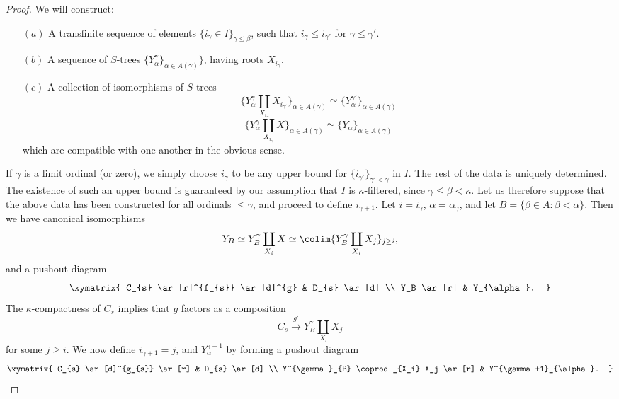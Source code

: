 \begin{proof}
We will construct:
\begin{itemize}
\item[$(a)$] A transfinite sequence of elements $\{ i_{\gamma} \in I \}_{\gamma \leq \beta}$, such that $i_{\gamma} \leq i_{\gamma'}$ for $\gamma \leq \gamma'$. 
\item[$(b)$] A sequence of $S$-trees $\{ Y^{\gamma}_{\alpha} \}_{\alpha \in A(\gamma)} \}$, having roots $X_{i_{\gamma}}$. 
\item[$(c)$] A collection of isomorphisms of $S$-trees
$$ \{ Y^{\gamma}_{\alpha} \coprod_{X_{i_{\gamma}}} X_{i_{\gamma'}} \}_{\alpha \in A(\gamma)}
\simeq \{ Y^{\gamma'}_{\alpha} \}_{\alpha \in A(\gamma)}$$
$$ \{ Y^{\gamma}_{\alpha} \coprod_{ X_{i_{\gamma}}} X \}_{\alpha \in A(\gamma)}
\simeq \{ Y_{\alpha} \}_{ \alpha \in A(\gamma) }$$
which are compatible with one another in the obvious sense.
\end{itemize}
If $\gamma$ is a limit ordinal (or zero), we simply choose $i_{\gamma}$ to be
any upper bound for $\{ i_{\gamma'} \}_{\gamma' < \gamma}$ in $I$. The rest of the data is uniquely determined. The existence of such an upper bound is guaranteed by our assumption that $I$ is $\kappa$-filtered, since $\gamma \leq \beta < \kappa$. Let us therefore suppose that the above data has been constructed for all ordinals $\leq \gamma$, and proceed to define $i_{\gamma+1}$.
Let $i = i_{\gamma}$, $\alpha = \alpha_{\gamma}$, and let $B = \{ \beta \in A: \beta < \alpha \}$. Then
we have canonical isomorphisms
$$Y_{B} \simeq Y^{\gamma}_{B} \coprod_{X_i} X
\simeq \colim \{ Y^{\gamma}_{B} \coprod_{X_i} X_j \}_{j \geq i},$$
and a pushout diagram
$$ \xymatrix{ C_{s} \ar[r]^{f_{s}} \ar[d]^{g} & D_{s} \ar[d] \\
Y_B \ar[r] & Y_{\alpha}. }$$
The $\kappa$-compactness of $C_{s}$ implies that $g$ factors as a composition
$$ C_{s} \stackrel{g'}{\rightarrow} Y^{\gamma}_{B} \coprod_{ X_i} X_j $$
for some $j \geq i$. We now define $i_{\gamma+1} = j$, and
$Y^{\gamma+1}_{\alpha}$ by forming a pushout diagram
$$ \xymatrix{ C_{s} \ar[d]^{g_{s}} \ar[r] & D_{s} \ar[d] \\
Y^{\gamma}_{B} \coprod_{X_i} X_j \ar[r] & Y^{\gamma+1}_{\alpha}. }$$
\end{proof}


